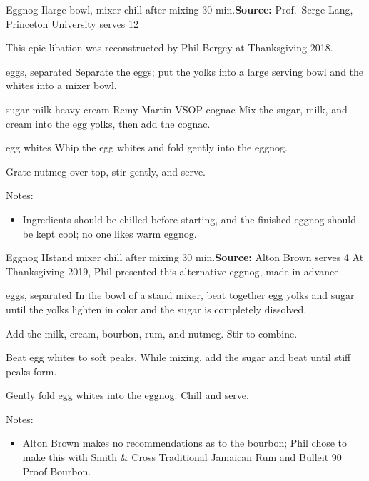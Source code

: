 \begin{recipe}{Eggnog I}{large bowl, mixer \hfill chill after mixing \hfill 30 min.}{\textbf{Source:} Prof.\ Serge Lang, Princeton University \hfill serves 12}

 \freeform This epic libation was reconstructed by Phil Bergey at Thanksgiving 2018.

 \ing[12]{} {eggs, separated}
 Separate the eggs; put the yolks into a large serving bowl and the whites into a mixer bowl.

  {sugar}
  {milk}
  {heavy cream}
  {Remy Martin VSOP cognac}
 Mix the sugar, milk, and cream into the egg yolks, then add the cognac.

 \ing[12]{} {egg whites}
 Whip the egg whites and fold gently into the eggnog.

 Grate nutmeg over top, stir gently, and serve.

 \freeform Notes:
 \begin{itemize}
  \item Ingredients should be chilled before starting, and the finished eggnog should be kept cool; no one likes warm eggnog.
 \end{itemize}

\end{recipe}

\begin{recipe}{Eggnog II}{stand mixer \hfill chill after mixing \hfill 30 min.}{\textbf{Source:} Alton Brown \hfill serves 4}
 \freeform At Thanksgiving 2019, Phil presented this alternative eggnog, made in advance.

 \ing[4]{} {eggs, separated}
 In the bowl of a stand mixer, beat together egg yolks and sugar until the yolks lighten in color and the sugar is completely dissolved.

 Add the milk, cream, bourbon, rum, and nutmeg. Stir to combine.

 Beat egg whites to soft peaks. While mixing, add the sugar and beat until stiff peaks form.

 \newstep Gently fold egg whites into the eggnog. Chill and serve.

 \freeform Notes:
 \begin{itemize}
  \item Alton Brown makes no recommendations as to the bourbon; Phil chose to make this with Smith \& Cross Traditional Jamaican Rum and Bulleit 90 Proof Bourbon.
 \end{itemize}
\end{recipe}
